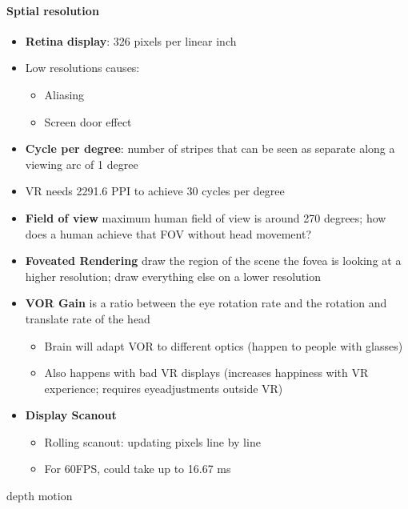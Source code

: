       \paragraph{Sptial resolution}
      \begin{itemize}
        \item \textbf{Retina display}: 326 pixels per linear inch
        \item Low resolutions causes:
        \begin{itemize}
          \item Aliasing
          \item Screen door effect
        \end{itemize}

        \item \textbf{Cycle per degree}: number of stripes that can be seen
        as separate along a viewing arc of 1 degree
        \item VR needs 2291.6 PPI to achieve 30 cycles per degree
        \item \textbf{Field of view} maximum human field of view is around
        270 degrees; how does a human achieve that FOV without head movement?
        \item \textbf{Foveated Rendering} draw the region of the scene the fovea
        is looking at a higher resolution; draw everything else on a lower
        resolution
        \item \textbf{VOR Gain} is a ratio between the eye rotation rate and
        the rotation and translate rate of the head
        \begin{itemize}
          \item Brain will adapt VOR to different optics (happen to people with
          glasses)
          \item Also happens with bad VR displays (increases happiness with VR
          experience; requires eyeadjustments outside VR)
        \end{itemize}

        \item \textbf{Display Scanout}
        \begin{itemize}
          \item Rolling scanout: updating pixels line by line
          \item For 60FPS, could take up to 16.67 ms
        \end{itemize}

      \end{itemize}

{depth}
{motion}
